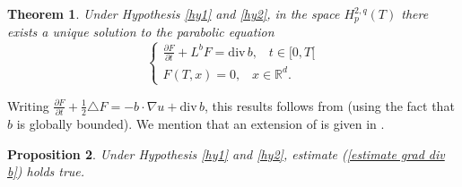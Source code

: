 \documentclass[a4paper,10pt]{article}
\newtheorem{theorem}{Theorem}
\newtheorem{proposition}[theorem]{Proposition}
\newtheorem{remark}[theorem]{Remark}
\begin{document}
\begin{theorem} \label{KR}
 Under  Hypothesis \ref{hy1} and \ref{hy2},  in the space $
 H^{2,q}_p(T)$ there exists a unique
 solution to the
 parabolic equation
$$ \left \{ \begin{aligned}
\frac{\partial F}{\partial t}+L^{b}F={\mathrm{div}\, }b,\;\; \; t
\in [0,T[
\\
F(T,x)=0,\;\;\; x \in \mathbb{R} ^d.
\end{aligned}
\right.
$$
\end{theorem}
 Writing $\frac{\partial F}{\partial t}+ \frac{1}{2} \triangle
  F =  - b \cdot \nabla u + {\mathrm{div}\, }b$,
 this results follows from \cite[Theorem 1.2]{Kr1} (using the fact that
  $b$ is globally bounded). We mention   that an extension  of
   \cite[Theorem 1.2]{Kr1} is given in \cite[Theorem
   10.3]{Kry-Ro}.




\begin{proposition}
 Under  Hypothesis \ref{hy1} and \ref{hy2}, estimate
(\ref{estimate grad div b}) holds true.
\end{proposition}
\end{document}
